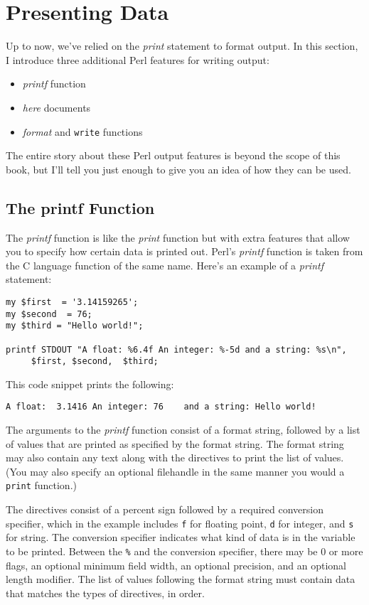 \section{Presenting Data}
Up to now, we've relied on the \textit{print} statement to format output. In this section, I introduce three additional Perl features for writing output:

\begin{itemize}
  \item \textit{printf} function
  \item \textit{here} documents
  \item \textit{format} and \verb|write| functions
\end{itemize}

The entire story about these Perl output features is beyond the scope of this book, but I'll tell you just enough to give you an idea of how they can be used.  

\subsection{The printf Function}
The \textit{printf} function is like the \textit{print} function but with extra features that allow you to specify how certain data is printed out. Perl's \textit{printf} function is taken from the C language function of the same name. Here's an example of a \textit{printf} statement: 

\begin{lstlisting}
my $first  = '3.14159265';
my $second  = 76;
my $third = "Hello world!";

printf STDOUT "A float: %6.4f An integer: %-5d and a string: %s\n", 
     $first, $second,  $third;
\end{lstlisting}

This code snippet prints the following:

\begin{lstlisting}
A float:  3.1416 An integer: 76    and a string: Hello world!
\end{lstlisting}

The arguments to the \textit{printf} function consist of a format string, followed by a list of values that are printed as specified by the format string. The format string may also contain any text along with the directives to print the list of values. (You may also specify an optional filehandle in the same manner you would a \verb|print| function.)

The directives consist of a percent sign followed by a required conversion specifier, which in the example includes \verb|f| for floating point, \verb|d| for integer, and \verb|s| for string. The conversion specifier indicates what kind of data is in the variable to be printed. Between the \verb|%| and the conversion specifier, there may be 0 or more flags, an optional minimum field width, an optional precision, and an optional length modifier. The list of values following the format string must contain data that matches the types of directives, in order.

